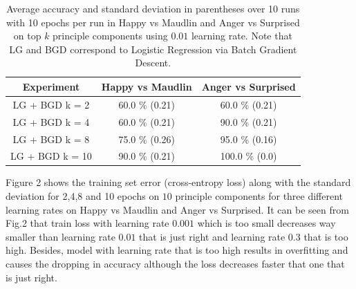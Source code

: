 \documentclass{article}
\begin{document}
\begin{table}
\begin{center}
\setlength{\tabcolsep}{9mm}
\begin{tabular}{c|cc}
\toprule
Experiment& Happy vs Maudlin & Anger vs Surprised \\
\midrule
LG + BGD k = 2 & 60.0 \% (0.21) & 60.0 \% (0.21) \\
\midrule
LG + BGD k = 4 & 60.0 \% (0.21) & 90.0 \% (0.21) \\
\midrule
LG + BGD k = 8 & 75.0 \% (0.26) & 95.0 \% (0.16) \\
\midrule
LG + BGD k = 10 & 90.0 \% (0.21) & 100.0 \% (0.0) \\
\bottomrule
\end{tabular}
\caption{Average accuracy and standard deviation in parentheses over 10 runs with 10 epochs per run in Happy vs Maudlin and Anger vs Surprised on top $k$ principle components using $0.01$ learning rate. Note that LG and BGD correspond to Logistic Regression via Batch Gradient Descent.}
\end{center}
\end{table}

Figure 2 shows the training set error (cross-entropy loss) along with the standard deviation for 2,4,8 and 10 epochs on $10$ principle components for three different learning rates on Happy vs Maudlin and Anger vs Surprised. It can be seen from Fig.2 that train loss with learning rate $0.001$ which is too small decreases way smaller than learning rate $0.01$ that is just right and learning rate $0.3$ that is too high. Besides, model with learning rate that is too high results in overfitting and causes the dropping in accuracy although the loss decreases faster that one that is just right.
\end{document}
